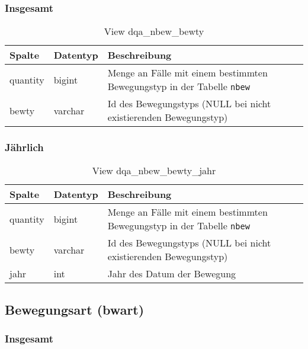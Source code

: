 \subsubsection{Insgesamt} \label{subsubsec:bewtypI}

\begin{table}[ht]
	\centering   
	\caption{View dqa\_nbew\_bewty}
	\label{tab:bewBtyI}
	\begin{tabular}{||l|l|p{10cm}||}   		
		\hline
		Spalte & Datentyp & Beschreibung \\ [0.5ex]
		\hline\hline
		quantity & bigint & Menge an Fälle mit einem bestimmten Bewegungstyp in der Tabelle \texttt{nbew} \\
		\hline
		bewty & varchar & Id des Bewegungstyps (NULL bei nicht existierenden Bewegungstyp)\\
		\hline
		
	\end{tabular}
\end{table}

\newpage

\subsubsection{Jährlich} \label{subsubsec:bewtypJ}

\begin{table}[ht]
	\centering   
	\caption{View dqa\_nbew\_bewty\_jahr}
	\label{tab:bewBtyJ}
	\begin{tabular}{||l|l|p{10cm}||}   		
		\hline
		Spalte & Datentyp & Beschreibung \\ [0.5ex]
		\hline\hline
		quantity & bigint & Menge an Fälle mit einem bestimmten Bewegungstyp in der Tabelle \texttt{nbew}\\
		\hline
		bewty & varchar & Id des Bewegungstyps (NULL bei nicht existierenden Bewegungstyp)\\
		\hline
		jahr & int &  Jahr des Datum der Bewegung \\
		\hline		
	\end{tabular}
\end{table}

\subsection{Bewegungsart (bwart)} \label{subsec:bewart}

\subsubsection{Insgesamt} \label{subsubsec:bewartI}

